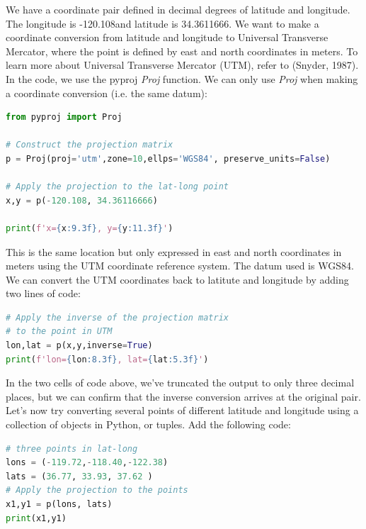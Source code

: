 \documentclass[a4paper , 12pt]{book}
\begin{document}
We have a coordinate pair defined in decimal degrees of latitude and longitude. The longitude is -120.108\degree and latitude is 34.3611666\degree. We want to make a coordinate conversion from latitude and longitude to Universal Transverse Mercator, where the point is defined by east and north coordinates in meters. To learn more about Universal Transverse Mercator (UTM), refer to (Snyder, 1987). In the code, we use the pyproj \textit{Proj} function. We can only use \textit{Proj} when making a coordinate conversion (i.e. the same datum):

\begin{center}
\begin{lstlisting}[language=Python, frame=single]
from pyproj import Proj

# Construct the projection matrix
p = Proj(proj='utm',zone=10,ellps='WGS84', preserve_units=False)

# Apply the projection to the lat-long point
x,y = p(-120.108, 34.36116666)

print(f'x={x:9.3f}, y={y:11.3f}')
\end{lstlisting}
\end{center}

This is the same location but only expressed in east and north coordinates in meters using the UTM coordinate reference system. The datum used is WGS84. We can convert the UTM coordinates back to latitute and longitude by adding two lines of code:

\begin{center}
\begin{lstlisting}[language=Python, frame=single]
# Apply the inverse of the projection matrix
# to the point in UTM
lon,lat = p(x,y,inverse=True)
print(f'lon={lon:8.3f}, lat={lat:5.3f}')
\end{lstlisting}
\end{center}

In the two cells of code above, we’ve truncated the output to only three decimal places, but we can confirm that the inverse conversion arrives at the original pair. Let's now try converting several points of different latitude and longitude using a collection of objects in Python, or tuples. Add the following code:

\begin{center}
\begin{lstlisting}[language=Python, frame=single]
# three points in lat-long
lons = (-119.72,-118.40,-122.38)
lats = (36.77, 33.93, 37.62 )
# Apply the projection to the points
x1,y1 = p(lons, lats)
print(x1,y1)
\end{lstlisting}
\end{center}
\end{document}
